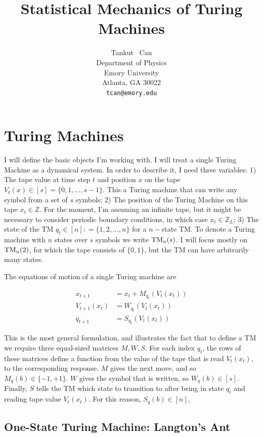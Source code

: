 \documentclass{article}
\title{Statistical Mechanics of Turing Machines}
\author{%
  Tankut ~Can\\
  Department of Physics\\
  Emory University\\
  Atlanta, GA 30022 \\
  \texttt{tcan@emory.edu} \\
}
\begin{document}
\maketitle
\tableofcontents

\section{Turing Machines}
\label{sec:turing-machines}

I will define the basic objects I'm working with. I will treat a single Turing Machine as a dynamical system. In order to describe it, I need three variables: 1) The tape value at time step $t$ and position $x$ on the tape $V_{t}(x) \in [s] = \{ 0, 1, ..., s-1\}$. This a Turing machine that can write any symbol from a set of $s$ symbols; 2) The position of the Turing Machine on this tape $x_{t} \in \mathbb{Z}$. For the moment, I'm assuming an infinite tape, but it might be necessary to consider periodic boundary conditions, in which case $x_{t} \in \mathbb{Z}_{L}$; 3) The state of the TM $q_{t} \in [ n] : = \{ 1, 2, ..., n\}$ for a $n-$state TM. To denote a Turing machine with $n$ states over $s$ symbols we write ${\rm TM}_{n}(s)$. I will focus mostly on ${\rm TM}_{n}(2)$, for which the tape consists of $\{0,1\}$, but the TM can have arbitrarily many states. 


The equations of motion of a single Turing machine are


\begin{align}
x_{t+1} &= x_{t} +M_{q_{t}}\left( V_{t}(x_{t})\right)\\
V_{t+1}(x_{t}) & = W_{q_{t}}\left( V_{t}(x_{t})\right)\\
q_{t+1} & = S_{q_{t}}\left( V_{t}(x_{t})\right)
\end{align}

This is the most general formulation, and illustrates the fact that to define a TM we require three equal-sized matrices $M, W, S$. For each index $q_{t}$, the rows of these matrices define a function from the value of the tape that is read $V_{t}(x_{t})$, to the corresponding response. $M$ gives the next move, and so $M_{q}(b) \in \{-1, +1\}$. $W$ gives the symbol that is written, so $W_{q}(b) \in [ s]$. Finally, $S$ tells the TM which state to transition to after being in state $q_{t}$ and reading tape value $V_{t}(x_{t})$. For this reason, $S_{q}(b) \in [n]$, 




\subsection{One-State Turing Machine: Langton's Ant}
\label{sec:langton-ant}
\end{document}

